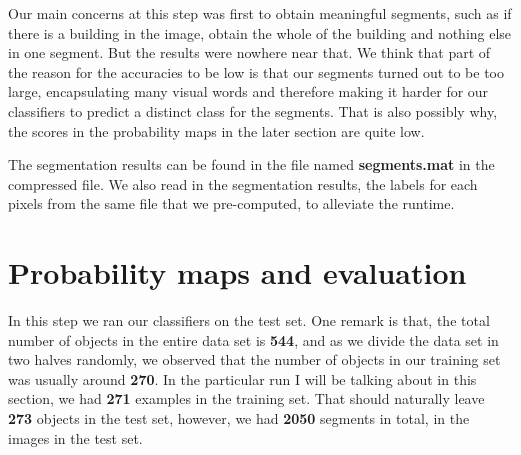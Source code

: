 \documentclass[conference]{IEEEtran}
\newcommand{\sixthsection}{Probability maps and evaluation}
\begin{document}
Our main concerns at this step was first to obtain meaningful segments, such as if there is a building in the image, obtain the whole of the building and nothing else in one segment. But the results were nowhere near that. We think that part of the reason for the accuracies to be low is that our segments turned out to be too large, encapsulating many visual words and therefore making it harder for our classifiers to predict a distinct class for the segments. That is also possibly why, the scores in the probability maps in the later section are quite low.

The segmentation results can be found in the file named \textbf{segments.mat} in the compressed file. We also read in the segmentation results, the labels for each pixels from the same file that we pre-computed, to alleviate the runtime.

\section{\sixthsection}

In this step we ran our classifiers on the test set. One remark is that, the total number of objects in the entire data set is \textbf{544}, and as we divide the data set in two halves randomly, we observed that the number of objects in our training set was usually around \textbf{270}. In the particular run I will be talking about in this section, we had \textbf{271} examples in the training set. That should naturally leave \textbf{273} objects in the test set, however, we had \textbf{2050} segments in total, in the images in the test set. 

\begin{algorithm}[!h]
 \caption{Our algorithm to create the probability maps, see the relevant part in our code for clarity}
\end{algorithm}
\end{document}
